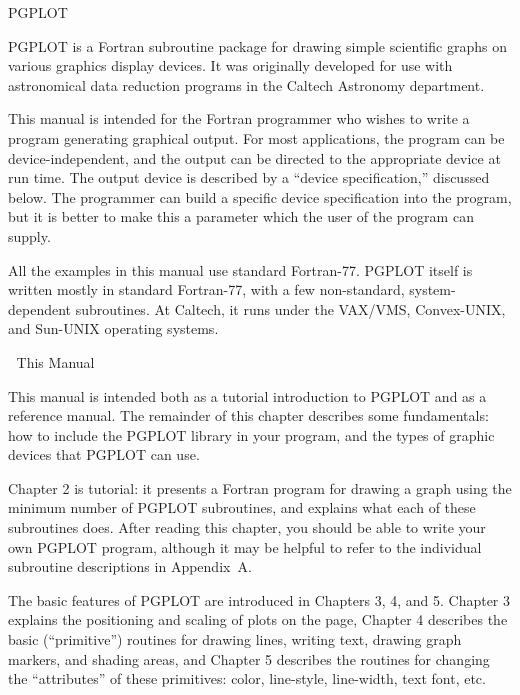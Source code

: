 

\beginsection PGPLOT

PGPLOT is a Fortran subroutine package for drawing simple scientific
graphs on various graphics display devices. It was originally developed
for use with astronomical data reduction programs in the Caltech Astronomy
department.

This manual is intended for the Fortran programmer who wishes to write a
program generating graphical output.  For most applications, the program
can be device-independent, and the output can be directed to the
appropriate device at run time.  The output device is described by a
``device specification,'' discussed below. The programmer can build a
specific device specification into the program, but it is better to make
this a parameter which the user of the program can supply. 

All the examples in this manual use standard Fortran-77. PGPLOT itself 
is written mostly in standard Fortran-77, with a few non-standard, 
system-dependent subroutines. At Caltech, it runs under the VAX/VMS,
Convex-UNIX, and Sun-UNIX operating systems.


\beginsection This Manual

This manual is intended both as a tutorial introduction to PGPLOT and as 
a reference manual.  The remainder of this chapter describes some 
fundamentals: how to include the PGPLOT library in your program, and the
types of graphic devices that PGPLOT can use.

Chapter 2 is tutorial: it presents a Fortran program for drawing a
graph using the minimum number of PGPLOT subroutines, and explains what
each of these subroutines does.  After reading this chapter, you should 
be able to write your own PGPLOT program, although it may be helpful to 
refer to the individual subroutine descriptions in Appendix~A.

The basic features of PGPLOT are introduced in Chapters 3, 4, and 5.
Chapter 3 explains the positioning and scaling of plots on the page,
Chapter 4 describes the basic (``primitive'') routines for drawing 
lines, writing text, drawing graph markers, and shading areas, and
Chapter 5 describes the routines for changing the ``attributes'' of 
these primitives: color, line-style, line-width, text font, etc.

